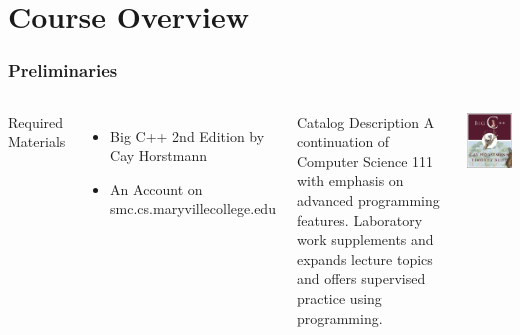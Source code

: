 \documentclass[handout]{beamer}
\begin{document}
\section{Course Overview}
\begin{frame}
   \frametitle{Preliminaries}
   \begin{columns}
      Required Materials
      \begin{itemize}
         \item Big C++ 2nd Edition by Cay Horstmann
         \item An Account on smc.cs.maryvillecollege.edu
      \end{itemize}
      \begin{block}{Catalog Description}
      A continuation of Computer Science 111 with emphasis on advanced programming features. Laboratory work supplements and expands lecture topics and offers supervised practice using programming.
      \end{block}
      \includegraphics[width=\textwidth]{images/bigcpp}
   \end{columns}
\end{frame}
\end{document}

